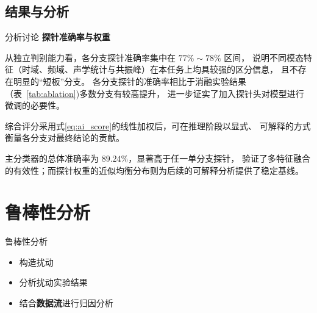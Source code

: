\documentclass[aspectratio=169]{beamer}
\providecommand{\paragraph}[1]{\smallskip\textbf{#1}\par}
\begin{document}
\subsection{结果与分析}
\begin{frame}{分析讨论}
\paragraph{探针准确率与权重} 

从独立判别能力看，各分支探针准确率集中在 $77\%\sim78\%$ 区间，
说明不同模态特征（时域、频域、声学统计与共振峰）在本任务上均具较强的区分信息，
且不存在明显的“短板”分支。
各分支探针的准确率相比于消融实验结果（表~\ref{tab:ablation})多数分支有较高提升，
进一步证实了加入探针头对模型进行微调的必要性。

综合评分采用式\ref{eq:ai_score}的线性加权后，可在推理阶段以显式、
可解释的方式衡量各分支对最终结论的贡献。

主分类器的总体准确率为 $89.24\%$，显著高于任一单分支探针，
验证了多特征融合的有效性；而探针权重的近似均衡分布则为后续的可解释分析提供了稳定基线。
\end{frame}



\section{鲁棒性分析}
\begin{frame}{鲁棒性分析}
  \begin{itemize}
    \item 构造扰动
    \item 分析扰动实验结果
    \item 结合\textbf{数据流}进行归因分析
  \end{itemize}
\end{frame}
\end{document}
